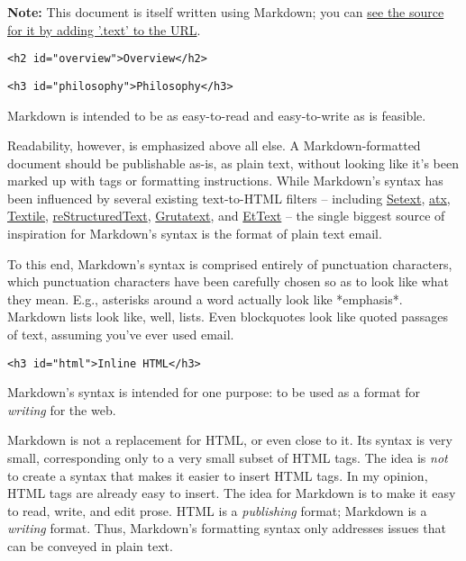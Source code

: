 \textbf{Note:} This document is itself written using Markdown; you
can \href{/projects/markdown/syntax.text}{see the source for it by adding '.text' to the URL}.

\noindent\makebox[\linewidth]{\rule{\linewidth}{0.4pt}}


\begin{lstlisting}<h2 id="overview">Overview</h2>\end{lstlisting}


\begin{lstlisting}<h3 id="philosophy">Philosophy</h3>\end{lstlisting}




Markdown is intended to be as easy-to-read and easy-to-write as is feasible.



Readability, however, is emphasized above all else. A Markdown-formatted
document should be publishable as-is, as plain text, without looking
like it's been marked up with tags or formatting instructions. While
Markdown's syntax has been influenced by several existing text-to-HTML
filters -- including \href{http://docutils.sourceforge.net/mirror/setext.html}{Setext}, \href{http://www.aaronsw.com/2002/atx/}{atx}, \href{http://textism.com/tools/textile/}{Textile}, \href{http://docutils.sourceforge.net/rst.html}{reStructuredText},
\href{http://www.triptico.com/software/grutatxt.html}{Grutatext}, and \href{http://ettext.taint.org/doc/}{EtText} -- the single biggest source of
inspiration for Markdown's syntax is the format of plain text email.



To this end, Markdown's syntax is comprised entirely of punctuation
characters, which punctuation characters have been carefully chosen so
as to look like what they mean. E.g., asterisks around a word actually
look like *emphasis*. Markdown lists look like, well, lists. Even
blockquotes look like quoted passages of text, assuming you've ever
used email.

\begin{lstlisting}<h3 id="html">Inline HTML</h3>\end{lstlisting}




Markdown's syntax is intended for one purpose: to be used as a
format for \emph{writing} for the web.



Markdown is not a replacement for HTML, or even close to it. Its
syntax is very small, corresponding only to a very small subset of
HTML tags. The idea is \emph{not} to create a syntax that makes it easier
to insert HTML tags. In my opinion, HTML tags are already easy to
insert. The idea for Markdown is to make it easy to read, write, and
edit prose. HTML is a \emph{publishing} format; Markdown is a \emph{writing}
format. Thus, Markdown's formatting syntax only addresses issues that
can be conveyed in plain text.



